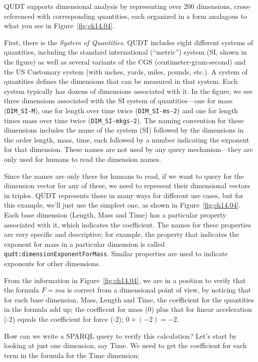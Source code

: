 QUDT supports dimensional analysis by representing over 200 dimensions,
cross-referenced with corresponding quantities, each organized in a 
form analagous to what you see in Figure~\ref{fig;ch14.04}.

First, there is the \emph{System of Quantities}. QUDT includes eight different
systems of quantities, including the standard international (``metric'')
system (SI, shown in the figure) as well as several variants of the CGS
(centimeter-gram-second) and the US Customary system (with inches,
yards, miles, pounds, etc.). A system of quantities defines the
dimensions that can be measured in that system. Each system typically
has dozens of dimensions associated with it. In the figure, we see three
dimensions associated with the SI system of quantities---one for mass
(\texttt{DIM\_SI-M}), one for length over time twice (\texttt{DIM\_SI-ms-2})
and one for length times mass over time twice (\texttt{DIM\_SI-mkgs-2}).
The naming convention for these dimensions includes the name of the
system (SI) followed by the dimensions in the order length, mass, time,
each followed by a number indicating the exponent for that dimension.
These names are not used by any query mechanism---they are only used for
humans to read the dimension names.

Since the names are only there for humans to read, if we want to query
for the dimension vector for any of these, we need to represent their
dimensional vectors in triples.  QUDT represents these in many ways for 
different use cases, but for this example, we'll just use the simplest 
one, as shown in Figure~\ref{fig;ch14.04}.  Each base dimension (Length, Mass and Time) has a particular
property associated with it, which indicates the coefficient.  The names for 
these properties are very specific and descriptive; for example, the property that indicates
the exponent for mass in a particular dimension is called \texttt{qudt:dimensionExponentForMass}. Similar properties 
are used to indicate exponents for other dimensions. 

From the information in Figure~\ref{fig:ch14.04}, 
we are in
a position to verify  that the formula $F = ma$ 
is correct from a dimensional point of view, by noticing that for each base 
dimension, Mass, Length and Time, 
the coefficient for the quantities in the formula add up; the coefficent for mass (0) plus that for linear acceleration (-2)
equals the coefficient for force (-2); $0 + (-2) = -2$.

How can we write a SPARQL query to verify this calculation?  Let's start by 
looking at just one dimension, say Time.  We need to get the coefficient for each
term in the formula for the Time dimension:

